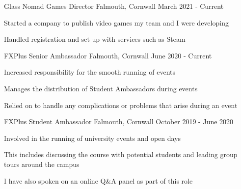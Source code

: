 

\begin{cventries}
    \cventry
        {Glass Nomad Games}
        {Director}
        {Falmouth, Cornwall}
        {March 2021 - Current}
        {
            \begin{cvitems}
                \item Started a company to publish video games my team and I were developing
                \item Handled registration and set up with services such as Steam
            \end{cvitems}
        }


    \cventry
        {FXPlus}
        {Senior Ambassador}
        {Falmouth, Cornwall}
        {June 2020 - Current}
        {
            \begin{cvitems}
                \item Increased responsibility for the smooth running of events
                \item Manages the distribution of Student Ambassadors during events
                \item Relied on to handle any complications or problems that arise during an event
            \end{cvitems}
        }

    \cventry
        {FXPlus}
        {Student Ambassador}
        {Falmouth, Cornwall}
        {October 2019 - June 2020}
        {
            \begin{cvitems}
                \item Involved in the running of university events and open days
                \item This includes discussing the course with potential students and leading group tours around the campus
                \item I have also spoken on an online Q\&A panel as part of this role
            \end{cvitems}
        }     
\end{cventries}